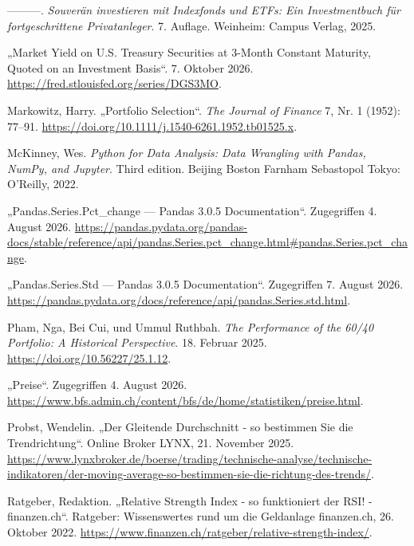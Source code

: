 \documentclass[
  ngerman,
  a4paper,
  DIV=11,
  oneside]{scrreprt}
\newlength{\cslhangindent}
\newenvironment{CSLReferences}[2] %
 {\begin{list}{}{%
  \setlength{\itemindent}{0pt}
  \setlength{\leftmargin}{0pt}
  \setlength{\parsep}{0pt}
  \ifodd #1
   \setlength{\leftmargin}{\cslhangindent}
   \setlength{\itemindent}{-1\cslhangindent}
  \fi
  \setlength{\itemsep}{#2\baselineskip}}}
 {\end{list}}
\begin{document}
\begin{CSLReferences}{1}{1}
---------. \emph{Souverän investieren mit Indexfonds und ETFs: Ein
Investmentbuch für fortgeschrittene Privatanleger}. 7. Auflage.
Weinheim: Campus Verlag, 2025.

{„Market {Yield} on {U}.{S}. {Treasury Securities} at 3-{Month Constant
Maturity}, {Quoted} on an {Investment Basis}``}. 7. Oktober 2026.
\url{https://fred.stlouisfed.org/series/DGS3MO}.

Markowitz, Harry. {„Portfolio {Selection}``}. \emph{The Journal of
Finance} 7, Nr. 1 (1952): 77--91.
\url{https://doi.org/10.1111/j.1540-6261.1952.tb01525.x}.

McKinney, Wes. \emph{Python for Data Analysis: Data Wrangling with
Pandas, {NumPy}, and {Jupyter}}. Third edition. Beijing Boston Farnham
Sebastopol Tokyo: O'Reilly, 2022.

{„Pandas.{Series}.Pct\_change --- Pandas 3.0.5 Documentation``}.
Zugegriffen 4. August 2026.
\url{https://pandas.pydata.org/pandas-docs/stable/reference/api/pandas.Series.pct_change.html\#pandas.Series.pct_change}.

{„Pandas.{Series}.Std --- Pandas 3.0.5 Documentation``}. Zugegriffen 7.
August 2026.
\url{https://pandas.pydata.org/docs/reference/api/pandas.Series.std.html}.

Pham, Nga, Bei Cui, und Ummul Ruthbah. \emph{The {Performance} of the
60/40 {Portfolio}: {A Historical Perspective}}. 18. Februar 2025.
\url{https://doi.org/10.56227/25.1.12}.

{„Preise``}. Zugegriffen 4. August 2026.
\url{https://www.bfs.admin.ch/content/bfs/de/home/statistiken/preise.html}.

Probst, Wendelin. {„Der Gleitende Durchschnitt - so bestimmen Sie die
Trendrichtung``}. Online Broker LYNX, 21. November 2025.
\url{https://www.lynxbroker.de/boerse/trading/technische-analyse/technische-indikatoren/der-moving-average-so-bestimmen-sie-die-richtung-des-trends/}.

Ratgeber, Redaktion. {„Relative Strength Index - so funktioniert der
RSI! - finanzen.ch``}. Ratgeber: Wissenswertes rund um die Geldanlage
\textbar{} finanzen.ch, 26. Oktober 2022.
\url{https://www.finanzen.ch/ratgeber/relative-strength-index/}.


\end{CSLReferences}
\end{document}
